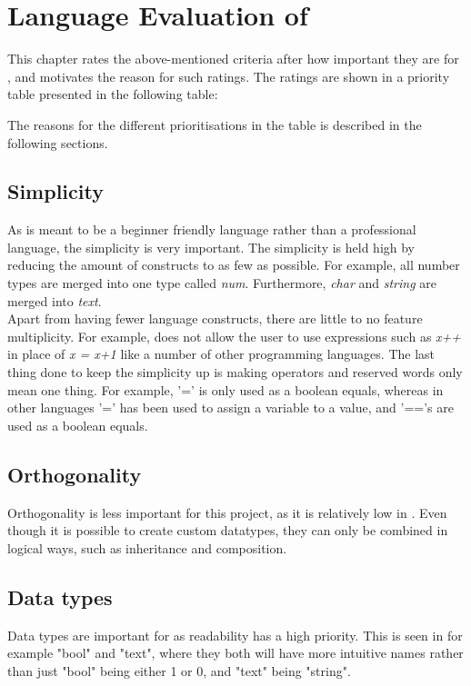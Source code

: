 \section{Language Evaluation of \lang{}}
This chapter rates the above-mentioned criteria after how important they are for \lang{}, and motivates the reason for such ratings. The ratings are shown in a priority table presented in the following table:



The reasons for the different prioritisations in the table is described in the following sections. 

\subsection*{Simplicity}
As \lang{} is meant to be a beginner friendly language rather than a professional language, the simplicity is very important. The simplicity is held high by reducing the amount of constructs to as few as possible. For example, all number types are merged into one type called \textit{num}. Furthermore, \textit{char} and \textit{string} are merged into \textit{text}. \\
Apart from having fewer language constructs, there are little to no feature multiplicity. For example, \lang{} does not allow the user to use expressions such as \textit{x++} in place of \textit{x = x+1} like a number of other programming languages.
The last thing done to keep the simplicity up is making operators and reserved words only mean one thing. For example, '=' is only used as a boolean equals, whereas in other languages '=' has been used to assign a variable to a value, and '=='s are used as a boolean equals.

\subsection*{Orthogonality}
Orthogonality is less important for this project, as it is relatively low in \lang{}. Even though it is possible to create custom datatypes, they can only be combined in logical ways, such as inheritance and composition. 

\subsection*{Data types}
Data types are important for \lang{} as readability has a high priority. This is seen in for example "bool" and "text", where they both will have more intuitive names rather than just "bool" being either 1 or 0, and "text" being "string". 

